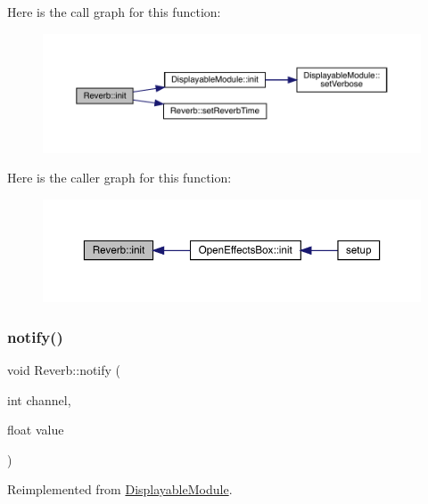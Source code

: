 Here is the call graph for this function\+:\nopagebreak
\begin{figure}[H]
\begin{center}
\leavevmode
\includegraphics[width=350pt]{class_reverb_ae82272ebf02fe46091a72eb04132a1c6_cgraph}
\end{center}
\end{figure}
Here is the caller graph for this function\+:\nopagebreak
\begin{figure}[H]
\begin{center}
\leavevmode
\includegraphics[width=350pt]{class_reverb_ae82272ebf02fe46091a72eb04132a1c6_icgraph}
\end{center}
\end{figure}
\mbox{\label{class_reverb_a0a4818faef8203311b3c31eb9d59c277}} 
\subsubsection{\texorpdfstring{notify()}{notify()}}
{\footnotesize\ttfamily void Reverb\+::notify (\begin{DoxyParamCaption}\item[{int}]{channel,  }\item[{float}]{value }\end{DoxyParamCaption})\hspace{0.3cm}{\ttfamily [virtual]}}



Reimplemented from \mbox{\hyperlink{class_displayable_module_a8ae5383931f10c54cff2feef2bc07dee}{Displayable\+Module}}.

